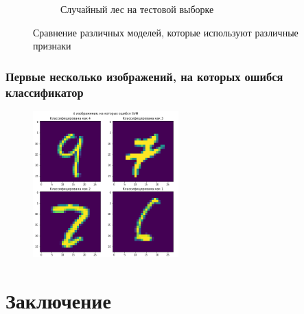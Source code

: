 \documentclass{beamer}
\begin{document}
\begin{frame}
\begin{figure}[!htbp]
\begin{subfigure}{0.25\textwidth}
					\caption{Случайный лес на тестовой выборке}
					\label{fig:6}
				\end{subfigure}
				\caption{Сравнение различных моделей, которые используют различные признаки}
				\label{accuracies_diff_features}
			\end{figure}
		\end{frame}
		\begin{frame}
			\frametitle{Первые несколько изображений, на которых ошибся классификатор}
			\begin{figure}[!htbp]
				\begin{center}
					\includegraphics[width=0.5\textwidth]{missclassified.png}\\
					\label{missclassified}
				\end{center}
			\end{figure}
		\end{frame}
		
	\section{Заключение}
	\iffalse
\end{document}
